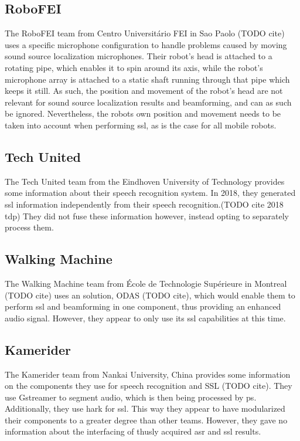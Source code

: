 \subsection{RoboFEI}
The RoboFEI team from Centro Universitário FEI in Sao Paolo (TODO cite) uses a specific microphone configuration to handle problems caused by moving sound source localization microphones.
Their robot's head is attached to a rotating pipe, which enables it to spin around its axis, while the robot's microphone array is attached to a static shaft running through that pipe which keeps it still.
As such, the position and movement of the robot's head are not relevant for sound source localization results and beamforming, and can as such be ignored.
Nevertheless, the robots own position and movement needs to be taken into account when performing \gls{ssl}, as is the case for all mobile robots.

\subsection{Tech United}
The Tech United team from the Eindhoven University of Technology provides some information about their speech recognition system.
In 2018, they generated \gls{ssl} information independently from their speech recognition.(TODO cite 2018 tdp)
They did not fuse these information however, instead opting to separately process them. %


\subsection{Walking Machine}
The Walking Machine team from École de Technologie Supérieure in Montreal (TODO cite) uses an solution, ODAS (TODO cite), which would enable them to perform \gls{ssl} and beamforming in one component, thus providing an enhanced audio signal.
However, they appear to only use its \gls{ssl} capabilities at this time.


\subsection{Kamerider}
The Kamerider team from Nankai University, China provides some information on the components they use for speech recognition and SSL (TODO cite).
They use Gstreamer to segment audio, which is then being processed by \gls{ps}.
Additionally, they use \gls{hark} for \gls{ssl}.
This way they appear to have modularized their components to a greater degree than other teams.
However, they gave no information about the interfacing of thusly acquired \gls{asr} and \gls{ssl} results.


